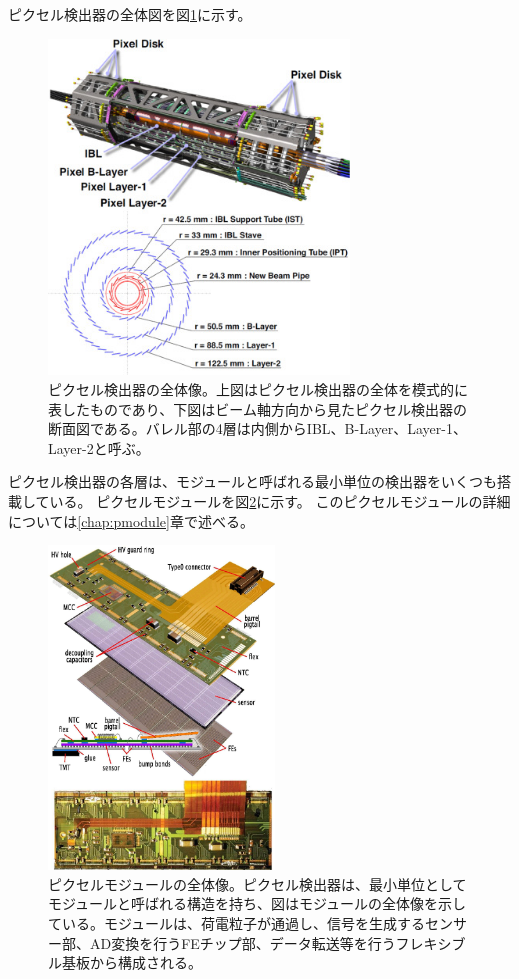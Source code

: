 ピクセル検出器の全体図を図\ref{pixel_detector_overview}に示す。
\begin{figure}[bpt]\centering
\includegraphics[width=8cm]{./pixel_detector_overview.jpg}
\caption[ピクセル検出器の全体像]{ピクセル検出器の全体像\cite{1-5}。上図はピクセル検出器の全体を模式的に表したものであり、下図はビーム軸方向から見たピクセル検出器の断面図である。バレル部の4層は内側からIBL、B-Layer、Layer-1、Layer-2と呼ぶ。}
\label{pixel_detector_overview}
\end{figure}

ピクセル検出器の各層は、モジュールと呼ばれる最小単位の検出器をいくつも搭載している。
ピクセルモジュールを図\ref{pixel_detector}に示す。
このピクセルモジュールの詳細については\ref{chap:pmodule}章で述べる。
\begin{figure}[bpt]\centering
\includegraphics[width=6cm]{./pixel_detector.png}
\caption[ピクセルモジュールの全体像]{ピクセルモジュールの全体像\cite{1-2}。ピクセル検出器は、最小単位としてモジュールと呼ばれる構造を持ち、図はモジュールの全体像を示している。モジュールは、荷電粒子が通過し、信号を生成するセンサー部、AD変換を行うFEチップ部、データ転送等を行うフレキシブル基板から構成される。}
\label{pixel_detector}
\end{figure}

